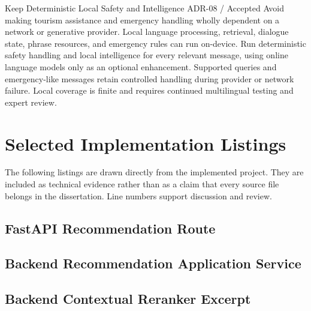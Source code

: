 \EvidenceSheet
{Keep Deterministic Local Safety and Intelligence}
{ADR-08 / Accepted}
{Avoid making tourism assistance and emergency handling wholly dependent on a network or generative provider.}
{Local language processing, retrieval, dialogue state, phrase resources, and emergency rules can run on-device.}
{Run deterministic safety handling and local intelligence for every relevant message, using online language models only as an optional enhancement.}
{Supported queries and emergency-like messages retain controlled handling during provider or network failure.}
{Local coverage is finite and requires continued multilingual testing and expert review.}

\chapter{Selected Implementation Listings}
\label{app:listings}

The following listings are drawn directly from the implemented project. They
are included as technical evidence rather than as a claim that every source
file belongs in the dissertation. Line numbers support discussion and review.

\clearpage
\section{FastAPI Recommendation Route}


\clearpage
\section{Backend Recommendation Application Service}


\clearpage
\section{Backend Contextual Reranker Excerpt}



